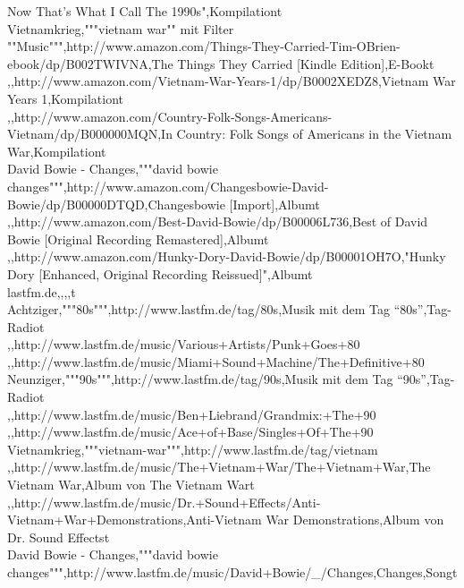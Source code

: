 Now That's What I Call The 1990s",Kompilationt\\
Vietnamkrieg,"""vietnam war"" mit Filter ""Music""",http://www.amazon.com/Things-They-Carried-Tim-OBrien-ebook/dp/B002TWIVNA,The Things They Carried [Kindle Edition],E-Bookt\\
,,http://www.amazon.com/Vietnam-War-Years-1/dp/B0002XEDZ8,Vietnam War Years 1,Kompilationt\\
,,http://www.amazon.com/Country-Folk-Songs-Americans-Vietnam/dp/B000000MQN,In Country: Folk Songs of Americans in the Vietnam War,Kompilationt\\
David Bowie - Changes,"""david bowie changes""",http://www.amazon.com/Changesbowie-David-Bowie/dp/B00000DTQD,Changesbowie [Import],Albumt\\
,,http://www.amazon.com/Best-David-Bowie/dp/B00006L736,Best of David Bowie [Original Recording Remastered],Albumt\\
,,http://www.amazon.com/Hunky-Dory-David-Bowie/dp/B00001OH7O,"Hunky Dory [Enhanced, Original Recording Reissued]",Albumt\\
lastfm.de,,,,t\\
Achtziger,"""80s""",http://www.lastfm.de/tag/80s,Musik mit dem Tag “80s”,Tag-Radiot\\
,,http://www.lastfm.de/music/Various+Artists/Punk+Goes+80%
,,http://www.lastfm.de/music/Miami+Sound+Machine/The+Definitive+80%
Neunziger,"""90s""",http://www.lastfm.de/tag/90s,Musik mit dem Tag “90s”,Tag-Radiot\\
,,http://www.lastfm.de/music/Ben+Liebrand/Grandmix:+The+90%
,,http://www.lastfm.de/music/Ace+of+Base/Singles+Of+The+90%
Vietnamkrieg,"""vietnam-war""",http://www.lastfm.de/tag/vietnam%
,,http://www.lastfm.de/music/The+Vietnam+War/The+Vietnam+War,The Vietnam War,Album von The Vietnam Wart\\
,,http://www.lastfm.de/music/Dr.+Sound+Effects/Anti-Vietnam+War+Demonstrations,Anti-Vietnam War Demonstrations,Album von Dr. Sound Effectst\\
David Bowie - Changes,"""david bowie changes""",http://www.lastfm.de/music/David+Bowie/_/Changes,Changes,Songt\\
